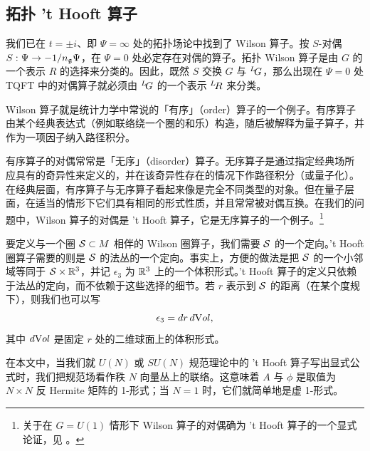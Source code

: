 
\subsection{拓扑 't Hooft 算子}

\label{sec:tophooft}

我们已在 $t=\pm i$、即 $\Psi=\infty$ 处的拓扑场论中找到了 Wilson 算子。按 $S$-对偶 $S:\Psi\to -1/n_{\frak g}\Psi$，在 $\Psi=0$ 处必定存在对偶的算子。拓扑 Wilson 算子是由 $G$ 的一个表示 $R$ 的选择来分类的。因此，既然 $S$ 交换 $G$ 与 $^L\negthinspace G$，那么出现在 $\Psi=0$ 处 TQFT 中的对偶算子就必须由 $^L\negthinspace G$ 的一个表示 $^L\negthinspace R$ 来分类。

Wilson 算子就是统计力学中常说的「有序」（order）算子的一个例子。有序算子由某个经典表达式（例如联络绕一个圈的和乐）构造，随后被解释为量子算子，并作为一项因子纳入路径积分。

有序算子的对偶常常是「无序」（disorder）算子。无序算子是通过指定经典场所应具有的奇异性来定义的，并在该奇异性存在的情况下作路径积分（或量子化）。在经典层面，有序算子与无序算子看起来像是完全不同类型的对象。但在量子层面，在适当的情形下它们具有相同的形式性质，并且常常被对偶互换。在我们的问题中，Wilson 算子的对偶是 't Hooft 算子，它是无序算子的一个例子。\footnote{关于在 $G=U(1)$ 情形下 Wilson 算子的对偶确为 't Hooft 算子的一个显式论证，见 \cite{ref89}。}

要定义与一个圈 ${\cal S}\subset M$ 相伴的 Wilson 圈算子，我们需要 ${\cal S}$ 的一个定向。't Hooft 圈算子需要的则是 ${\cal S}$ 的法丛的一个定向。事实上，方便的做法是把 ${\cal S}$ 的一个小邻域等同于 ${\cal S}\times \Bbb{R}^3$，并记 $\epsilon_3$ 为 $\Bbb{R}^3$ 上的一个体积形式。't Hooft 算子的定义只依赖于法丛的定向，而不依赖于这些选择的细节。若 $r$ 表示到 ${\cal S}$ 的距离（在某个度规下），则我们也可以写 %
\setcounter{equation}{5}
\begin{equation}\label{eq:congo}
\epsilon_3=dr\,d{\rm
Vol},
\end{equation}
 其中 $d{\rm Vol}$ 是固定 $r$ 处的二维球面上的体积形式。

在本文中，当我们就 $U(N)$ 或 $SU(N)$ 规范理论中的 't Hooft 算子写出显式公式时，我们把规范场看作秩 $N$ 向量丛上的联络。这意味着 $A$ 与 $\phi$ 是取值为 $N\times N$ 反 Hermite 矩阵的 1-形式；当 $N=1$ 时，它们就简单地是虚 1-形式。

